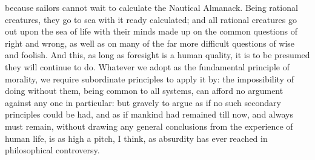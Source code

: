 \documentclass[12pt]{article}
\begin{document}
because sailors cannot wait to calculate the Nautical Almanack. Being rational creatures, they go to sea with it ready calculated; and all rational creatures go out upon the sea of life with their minds made up on the common questions of right and wrong, as well as on many of the far more difficult questions of wise and foolish. And this, as long as foresight is a human quality, it is to be presumed they will continue to do. Whatever we adopt as the fundamental principle of morality, we require subordinate principles to apply it by: the impossibility of doing without them, being common to all systems, can afford no argument against any one in particular: but gravely to argue as if no such secondary principles could be had, and as if mankind had remained till now, and always must remain, without drawing any general conclusions from the experience of human life, is as high a pitch, I think, as absurdity has ever reached in philosophical controversy.
\end{document}

